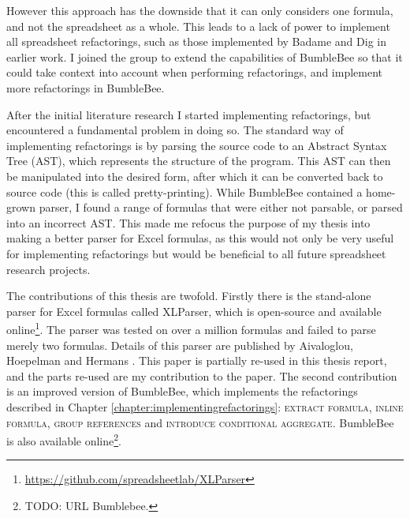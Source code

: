 \documentclass[12pt,a4paper,onecolumn,oneside,parskip]{memoir}
\newcommand{\rf}[1]{\textsc{\lowercase{#1}}}
\begin{document}
However this approach has the downside that it can only considers one formula, and not the spreadsheet as a whole.
This leads to a lack of power to implement all spreadsheet refactorings, such as those implemented by Badame and Dig \cite{badame2012refactoring} in earlier work.
I joined the group to extend the capabilities of BumbleBee so that it could take context into account when performing refactorings, and implement more refactorings in BumbleBee.

After the initial literature research I started implementing refactorings, but encountered a fundamental problem in doing so.
The standard way of implementing refactorings is by parsing the source code to an Abstract Syntax Tree (AST), which represents the structure of the program.
This AST can then be manipulated into the desired form, after which it can be converted back to source code (this is called pretty-printing).
While BumbleBee contained a home-grown parser, I found a range of formulas that were either not parsable, or parsed into an incorrect AST.
This made me refocus the purpose of my thesis into making a better parser for Excel formulas, as this would not only be very useful for implementing refactorings but would be beneficial to all future spreadsheet research projects.

The contributions of this thesis are twofold. Firstly there is the stand-alone parser for Excel formulas called XLParser, which is open-source and available online\footnote{\url{https://github.com/spreadsheetlab/XLParser}}. The parser was tested on over a million formulas and failed to parse merely two formulas.
Details of this parser are published by Aivaloglou, Hoepelman and Hermans \cite{xlparser}.
This paper is partially re-used in this thesis report, and the parts re-used are my contribution to the paper.
The second contribution is an improved version of BumbleBee, which implements the refactorings described in Chapter \ref{chapter:implementingrefactorings}: \rf{Extract Formula}, \rf{Inline Formula}, \rf{Group References} and \rf{Introduce Conditional Aggregate}.
BumbleBee is also available online\footnote{TODO: URL Bumblebee.}.
\end{document}
